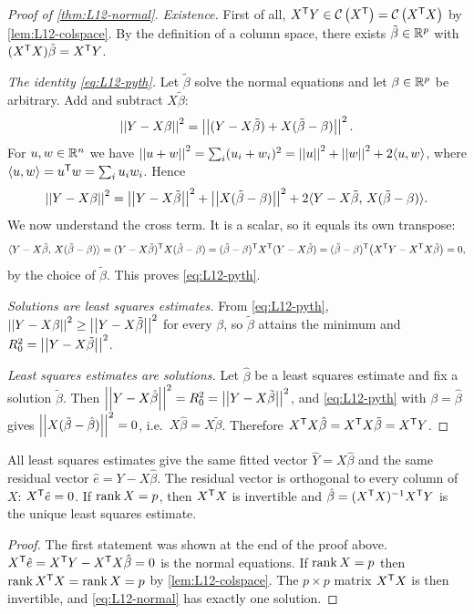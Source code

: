\begin{proof}[Proof of \cref{thm:L12-normal}]
\emph{Existence.} First of all, $X^{\mathsf T} Y\in\mathcal{C}\left(X^{\mathsf T}\right)=\mathcal{C}\left(X^{\mathsf T} X\right)$ by \cref{lem:L12-colspace}. By the
definition of a column space, there exists $\tilde\beta\in\mathbb R^p$ with $(X^{\mathsf T} X)\tilde\beta=X^{\mathsf T} Y$.

\emph{The identity \eqref{eq:L12-pyth}.} Let $\tilde\beta$ solve the normal equations and let $\beta\in\mathbb R^p$ be
arbitrary. Add and subtract $X\tilde\beta$:
\[
\left|\left|Y-X\beta\right|\right|^2=\left|\left|(Y-X\tilde\beta)+X(\tilde\beta-\beta)\right|\right|^2 .
\]
For $u,w\in\mathbb R^n$ we have $\left|\left|u+w\right|\right|^2=\sum_i(u_i+w_i)^2=\left|\left|u\right|\right|^2+\left|\left|w\right|\right|^2+2\langle u,w\rangle$, where
$\langle u,w\rangle=u^{\mathsf T} w=\sum_iu_iw_i$. Hence
\[
\left|\left|Y-X\beta\right|\right|^2=\left|\left|Y-X\tilde\beta\right|\right|^2+\left|\left|X(\tilde\beta-\beta)\right|\right|^2+2\langle Y-X\tilde\beta,\,X(\tilde\beta-\beta)\rangle .
\]
We now understand the cross term. It is a scalar, so it equals its own transpose:
\[
\langle Y-X\tilde\beta,\,X(\tilde\beta-\beta)\rangle=(Y-X\tilde\beta)^{\mathsf T} X(\tilde\beta-\beta)=(\tilde\beta-\beta)^{\mathsf T} X^{\mathsf T}(Y-X\tilde\beta)
=(\tilde\beta-\beta)^{\mathsf T}\bigl(X^{\mathsf T} Y-X^{\mathsf T} X\tilde\beta\bigr)=0,
\]
by the choice of $\tilde\beta$. This proves \eqref{eq:L12-pyth}.

\emph{Solutions are least squares estimates.} From \eqref{eq:L12-pyth},
$\left|\left|Y-X\beta\right|\right|^2\ge\left|\left|Y-X\tilde\beta\right|\right|^2$ for every $\beta$, so $\tilde\beta$ attains the minimum and
$R_0^2=\left|\left|Y-X\tilde\beta\right|\right|^2$.

\emph{Least squares estimates are solutions.} Let $\hat\beta$ be a least squares estimate and fix a solution
$\tilde\beta$. Then $\left|\left|Y-X\hat\beta\right|\right|^2=R_0^2=\left|\left|Y-X\tilde\beta\right|\right|^2$, and \eqref{eq:L12-pyth} with
$\beta=\hat\beta$ gives $\left|\left|X(\tilde\beta-\hat\beta)\right|\right|^2=0$, i.e.\ $X\hat\beta=X\tilde\beta$. Therefore
$X^{\mathsf T} X\hat\beta=X^{\mathsf T} X\tilde\beta=X^{\mathsf T} Y$.
\end{proof}

\begin{corollary}\label{cor:L12-fitted}
All least squares estimates give the same fitted vector $\hat Y=X\hat\beta$ and the same residual
vector $\hat e=Y-X\hat\beta$. The residual vector is orthogonal to every column of $X$: $X^{\mathsf T}\hat e=0$.
If $\operatorname{rank} X=p$, then $X^{\mathsf T} X$ is invertible and $\hat\beta=(X^{\mathsf T} X)^{-1}X^{\mathsf T} Y$ is the unique least squares estimate.
\end{corollary}
\begin{proof}
The first statement was shown at the end of the proof above. $X^{\mathsf T}\hat e=X^{\mathsf T} Y-X^{\mathsf T} X\hat\beta=0$ is the normal
equations. If $\operatorname{rank} X=p$ then $\operatorname{rank} X^{\mathsf T} X=\operatorname{rank} X=p$ by \cref{lem:L12-colspace}. The $p\times p$
matrix $X^{\mathsf T} X$ is then invertible, and \eqref{eq:L12-normal} has exactly one solution.
\end{proof}

